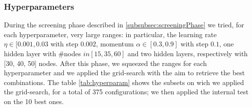 \subsubsection{Hyperparameters}\label{subsubsec:hyperparameters}
During the screening phase described in \ref{subsubsec:screeningPhase} we tried, for each hyperparameter, very large ranges: in particular, the learning rate $\eta \in [0.001, 0.03$ with step $0.002$, momentum $\alpha \in [0.3, 0.9]$ with step $0.1$, one hidden layer with \#nodes $in [15, 35, 60]$ and two hidden layers, respectively with [30, 40, 50] nodes. After this phase, we squeezed the ranges for each hyperparameter and we applied the grid-search with the aim to retrieve the best combinations. The table \ref{tab:hyperparam} shows the subsets on wich we applied the grid-search, for a total of 375 configurations; we then applied the internal test on the 10 best ones.
